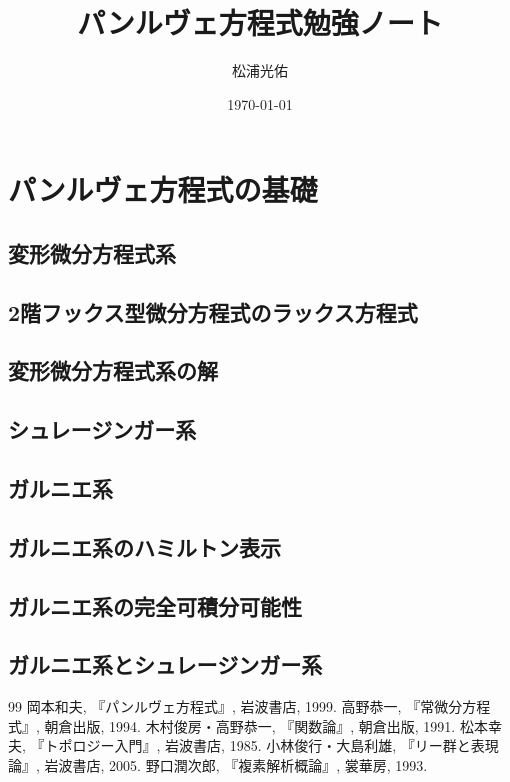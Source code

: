 \documentclass[paper=a4, fontsize=11pt]{jlreq} %
\title{パンルヴェ方程式勉強ノート}
\author{松浦光佑}
\date{\today}
\theoremstyle{break}
\theoremstyle{qa}
\begin{document}
\maketitle
\tableofcontents %



\section{パンルヴェ方程式の基礎}
\subsection{変形微分方程式系}

\subsection{2階フックス型微分方程式のラックス方程式}

\subsection{変形微分方程式系の解}

\subsection{シュレージンガー系}

\subsection{ガルニエ系}

\subsection{ガルニエ系のハミルトン表示}

\subsection{ガルニエ系の完全可積分可能性}

\subsection{ガルニエ系とシュレージンガー系}

\appendix


\begin{thebibliography}{99}
     岡本和夫, 『パンルヴェ方程式』, 岩波書店, 1999.
     高野恭一, 『常微分方程式』, 朝倉出版, 1994.
     木村俊房・高野恭一, 『関数論』, 朝倉出版, 1991.
     松本幸夫, 『トポロジー入門』, 岩波書店, 1985.
     小林俊行・大島利雄, 『リー群と表現論』, 岩波書店, 2005.
     野口潤次郎, 『複素解析概論』, 裳華房, 1993.
\end{thebibliography}
\end{document}
